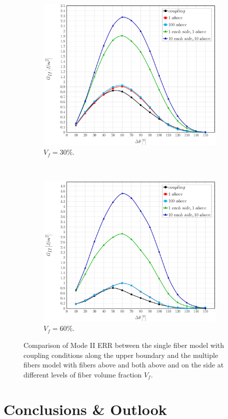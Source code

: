 \documentclass[review]{elsarticle}
\begin{document}
\begin{figure}[!h]
\centering
    \begin{subfigure}[b]{0.475\textwidth}
        \includegraphics[width=\textwidth]{comparecouplingabovesidefibers-vf30-GII.pdf}
        \caption{$V_{f}=30\%$.}\label{subfig:comparisoncoupling30MII}
    \end{subfigure} ~
    \begin{subfigure}[b]{0.475\textwidth}
        \includegraphics[width=\textwidth]{comparecouplingabovesidefibers-vf60-GII.pdf}
        \caption{$V_{f}=60\%$.}\label{subfig:comparisoncoupling60MII}
    \end{subfigure}

\caption{Comparison of Mode II ERR between the single fiber model with coupling conditions along the upper boundary and the multiple fibers model with fibers above and both above and on the side at different levels of fiber volume fraction $V_{f}$.}\label{fig:comparisoncouplingMII}
\end{figure}

\section{Conclusions \& Outlook}
\end{document}
